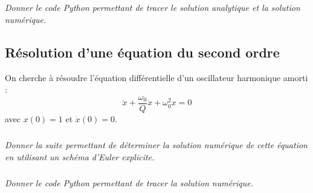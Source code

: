 \documentclass[10pt]{article}
\newif\ifprof
\begin{document}
\subparagraph{}
\textit{Donner le code Python permettant de tracer le solution analytique et la solution numérique.}

\setcounter{subparagraph}{0}
\subsection*{Résolution d'une équation du second ordre}
On cherche à résoudre l'équation différentielle d'un oscillateur harmonique amorti : 
$$
\ddot{x}  + \dfrac{\omega_0}{Q}\dot{x} + \omega_0^2 x = 0
$$
 avec $x(0)=1$ et $\dot{x}(0)=0$.
 
\subparagraph{}
\textit{Donner la suite permettant de déterminer la solution numérique de cette équation en utilisant un schéma d'Euler explicite.}
\ifprof
On pose $x_0(t)=x(t)$ et $x_1(t)=\dot{x}(t)$. On a alors $\ddot{x}(t) \simeq \dfrac{x_{1,k+1}-x_{1,k}}{h}$. En conséquence, 
$$
\left\{
\begin{array}{l}
x_{1,k} = \dfrac{x_{0,k+1}-x_{0,k}}{h} \\
\dfrac{x_{1,k+1}-x_{1,k}}{h} + \dfrac{\omega_0}{Q}x_{1,k}+\omega_0^2 x_{0,k} = 0 
\end{array}
\right.
\Longleftrightarrow
\left\{
\begin{array}{l}
x_{0,k+1} = k x_{1,k} + x_{0,k}  \\
x_{1,k+1} =x_{1,k}- \dfrac{h \omega_0}{Q}x_{1,k}-h \omega_0^2 x_{0,k} 
\end{array}
\right.
$$

\else
\fi
\subparagraph{}
\textit{Donner le code Python permettant de tracer la solution numérique.}
\end{document}
